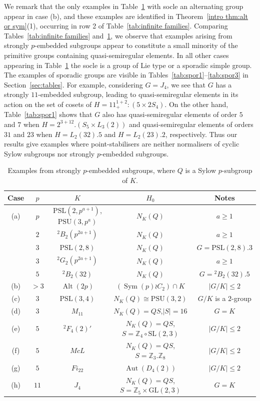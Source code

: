 \documentclass{article}
\theoremstyle{remark}
\theoremstyle{definition}
\DeclareMathOperator{\Alt}{Alt}
\DeclareMathOperator{\Sym}{Sym}
\DeclareMathOperator{\Aut}{Aut}
\newcommand{\GL}{\mathrm{GL}}
\newcommand{\SL}{\mathrm{SL}}
\newcommand{\PSL}{\mathrm{PSL}}
\newcommand{\PSU}{\mathrm{PSU}}
\newcommand{\qsres}{quasi-semiregular elements}
\begin{document}
We remark that the only  examples in Table~\ref{tab:st p embedded} with socle an alternating group appear in case (b), and these examples are identified in  Theorem~\ref{intro thm:alt or sym}(1), occurring  in row 2 of Table~\ref{tab:infinite families}. Comparing Tables~\ref{tab:infinite families} and~\ref{tab:st p embedded}, we observe that examples arising  from strongly $p$-embedded subgroups appear to constitute a small minority of the primitive groups containing {\qsres}. In all other cases appearing in Table~\ref{tab:st p embedded}  the socle is a group of Lie type or a sporadic simple group.  The examples of  sporadic groups are visible in Tables~\ref{tab:spor1}--\ref{tab:spor3} in Section~\ref{sec:tables}.  For example, considering $G=J_4$, we see that $G$ has a strongly $11$-embedded subgroup, leading to {\qsres} in its action on the set of cosets of $H=11^{1+2}_+:(5 \times 2S_4)$. On the other hand, Table~\ref{tab:spor1} shows that $G$ also has {\qsres} of order $5$ and $7$ when $H=2^{3+12}.(S_5 \times L_3(2))$ and {\qsres} of orders $31$ and $23$ when $H= L_2(32).5$ and $H=L_2(23).2$, respectively. Thus our results give examples where point-stabilisers are neither normalisers of cyclic Sylow subgroups nor  strongly $p$-embedded subgroups. 


\begin{table}
    \centering
    \begin{tabular}{c |c|c|c | c}
 Case       & $p$ & $K$                 & $H_0$  & Notes\\ \hline
      (a)   & $p$ & $\PSL(2,p^{a+1})$, $\PSU(3,p^a)$   & $N_K(Q)$ & $a\geqslant 1$ \\
      & $2$ &   ${}^2B_2(p^{2a+1})$ & $N_K(Q)$ & $a\geqslant 1$ \\
      & $3$ & $\PSL(2,8)$  & $N_K(Q)$ & $G= \PSL(2,8).3$ \\ 
      & $3$ & ${}^2G_2(p^{2a+1})$  & $N_K(Q)$ &$a\geqslant 1$ \\ 
      & $5$ & ${}^2B_2(32)$ & $N_K(Q)$ & $G={}^2B_2(32).5$ \\  
      (b)   & $>3$ & $\Alt(2p)$ & $(\Sym(p)\wr C_2)\cap K$  & $|G/K|\leqslant 2$ \\
      (c)   & $3$ &  $\PSL(3,4)$ & $N_K(Q) \cong \PSU(3,2)$ & $G/K$ is a $2$-group\\
       (d)  &  $3$ & $M_{11}$  & $N_K(Q) = QS$,\quad $|S|=16$ & $G=K$ \\
         (e)& $5$ & ${}^2F_4(2)'$  & $N_K(Q) = QS$,\quad  $S= \mathbb Z_4\circ \SL(2,3)$ & $|G/K| \leqslant 2$\\
       (f)  & $5$ & $McL$ & $N_K(Q)=QS$,\quad $S=\mathbb Z_3 .\mathbb Z_8$ & $|G/K| \leqslant 2$\\
       (g)  & $5$ &  $Fi_{22}$ & $\Aut(D_4(2))$ & $|G/K| \leqslant 2$\\
      (h)   & $11$ & $J_4$ & $N_K(Q) = QS$,\quad $S = \mathbb Z_5 \times \GL(2,3)$ & $G = K$ \\
    \end{tabular}
    \caption{Examples from strongly $p$-embedded subgroups, where $Q$ is a Sylow $p$-subgroup of $K$.}
    \label{tab:st p embedded}
\end{table}
\end{document}
